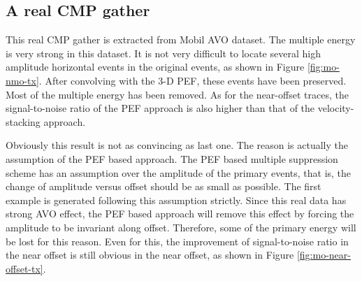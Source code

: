 
\subsection{A real CMP gather}

This real CMP gather is extracted from Mobil AVO dataset. The multiple energy 
is very strong in this dataset. It is not very difficult to locate several 
high amplitude horizontal events in the original events, as shown in Figure 
\ref{fig:mo-nmo-tx}. After convolving with the 3-D PEF, these events have been 
preserved. Most of the multiple energy has been removed. As for the 
near-offset traces, the signal-to-noise ratio of the PEF approach is also 
higher than that of the velocity-stacking approach. 

Obviously this result is not as convincing as last one. The reason is 
actually the assumption of the PEF based approach. The PEF based 
multiple suppression scheme has an assumption over the amplitude of the 
primary events, that is, the change of amplitude versus offset should be as 
small as possible. The first example is generated following this assumption 
strictly. Since this real data has strong AVO effect, the PEF based approach 
will remove this effect by forcing the amplitude to be invariant along offset. 
Therefore, some of the primary energy will be lost for this reason.
Even for this, the improvement of signal-to-noise ratio in the near offset 
is still obvious in the near offset, as shown in Figure 
\ref{fig:mo-near-offset-tx}.



